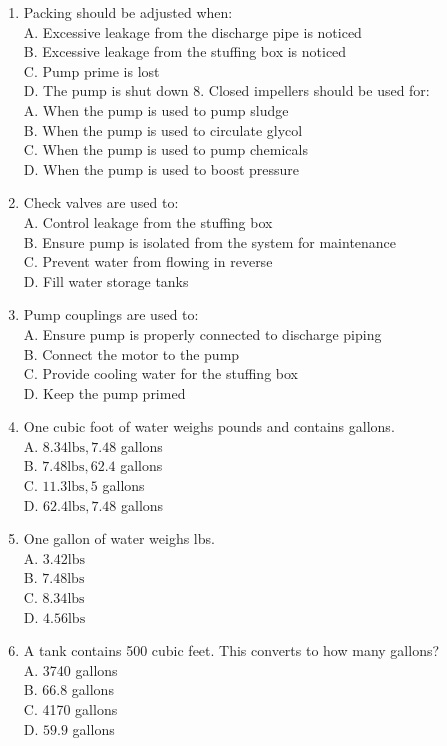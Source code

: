 \documentclass[10pt]{article}
\begin{document}
\begin{enumerate}
  \item Packing should be adjusted when:\\
A. Excessive leakage from the discharge pipe is noticed\\
B. Excessive leakage from the stuffing box is noticed\\
C. Pump prime is lost\\
D. The pump is shut down 8. Closed impellers should be used for:\\
A. When the pump is used to pump sludge\\
B. When the pump is used to circulate glycol\\
C. When the pump is used to pump chemicals\\
D. When the pump is used to boost pressure

  \item Check valves are used to:\\
A. Control leakage from the stuffing box\\
B. Ensure pump is isolated from the system for maintenance\\
C. Prevent water from flowing in reverse\\
D. Fill water storage tanks

  \item Pump couplings are used to:\\
A. Ensure pump is properly connected to discharge piping\\
B. Connect the motor to the pump\\
C. Provide cooling water for the stuffing box\\
D. Keep the pump primed

  \item One cubic foot of water weighs pounds and contains gallons.\\
A. $8.34 \mathrm{lbs}, 7.48$ gallons\\
B. $7.48 \mathrm{lbs}, 62.4$ gallons\\
C. $11.3 \mathrm{lbs}, 5$ gallons\\
D. $62.4 \mathrm{lbs}, 7.48$ gallons

  \item One gallon of water weighs lbs.\\
A. $3.42 \mathrm{lbs}$\\
B. $7.48 \mathrm{lbs}$\\
C. $8.34 \mathrm{lbs}$\\
D. $4.56 \mathrm{lbs}$

  \item A tank contains 500 cubic feet. This converts to how many gallons?\\
A. 3740 gallons\\
B. $66.8$ gallons\\
C. 4170 gallons\\
D. $59.9$ gallons


\end{enumerate}
\end{document}
